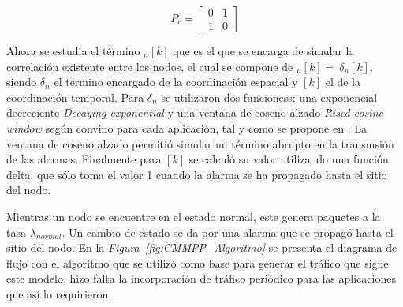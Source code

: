\begin{equation}
P_{c} = 
\begin{bmatrix}
0 & 1 \\
1 & 0 
\end{bmatrix}
\end{equation}

Ahora se estudia el término $_n\left[k\right]$ que es el que se encarga de simular la correlación existente entre los nodos, el cual se compone de $_n\left[k\right]=\ {\delta }_n[k]$, siendo ${\delta }_n$ el término encargado de la coordinación espacial y $[k]$ el de la coordinación temporal. Para ${\delta }_n$ se utilizaron dos funcioness: una exponencial decreciente \textit{Decaying exponential} y una ventana de coseno alzado \textit{Rised-cosine window} según convino para cada aplicación, tal y como se propone en \parencite{Gupta2018}.  La ventana de coseno alzado permitió simular un término abrupto en la transmsión de las alarmas. Finalmente para $[k]$ se calculó su valor utilizando una función delta, que sólo toma el valor 1 cuando la alarma se ha propagado hasta el sitio del nodo. \newline

Mientras un nodo se encuentre en el estado normal, este genera paquetes a la tasa $\lambda_{normal}$. Un cambio de estado se da por una alarma que se propagó hasta el sitio del nodo. En la \textit{Figura~\ref{fig:CMMPP_Algoritmo}} se presenta el diagrama de flujo con el algoritmo que se utilizó como base para generar el tráfico que sigue este modelo, hizo falta la incorporación de tráfico periódico para las aplicaciones que así lo requirieron.\newline

